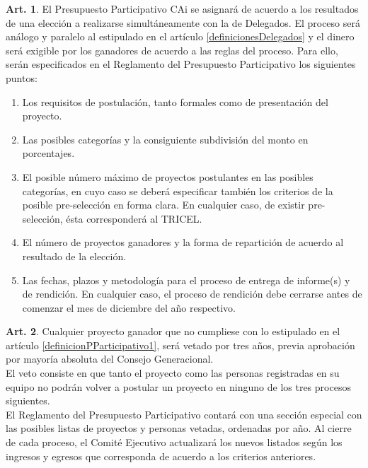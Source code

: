 \documentclass[letterpaper,11pt]{article}
\theoremstyle{definition}%
\newtheorem{art}{Art.} %
\newcommand{\aref}[1]{\hyperref[#1]{\ref*{#1}}}
\begin{document}
\begin{art}\label{definicionPParticipativo2}
	El Presupuesto Participativo CAi se asignará de acuerdo a los resultados de una elección a realizarse simultáneamente con la de Delegados. El proceso será análogo y paralelo al estipulado en el artículo \aref{definicionesDelegados} y el dinero será exigible por los ganadores de acuerdo a las reglas del proceso. Para ello, serán especificados en el Reglamento del Presupuesto Participativo los siguientes puntos:
	\begin{enumerate}
		\item Los requisitos de postulación, tanto formales como de presentación del proyecto.
		\item Las posibles categorías y la consiguiente subdivisión del monto en porcentajes.
		\item El posible número máximo de proyectos postulantes en las posibles categorías, en cuyo caso se deberá especificar también los criterios de la posible pre-selección en forma clara. En cualquier caso, de existir pre-selección, ésta corresponderá al TRICEL\@.
		\item El número de proyectos ganadores y la forma de repartición de acuerdo al resultado de la elección.
		\item Las fechas, plazos y metodología para el proceso de entrega de informe(s) y de rendición. En cualquier caso, el proceso de rendición debe cerrarse antes de comenzar el mes de diciembre del año respectivo.
	\end{enumerate}
\end{art}

\begin{art}\label{sancionesPParticipativo}
	Cualquier proyecto ganador que no cumpliese con lo estipulado en el artículo \aref{definicionPParticipativo1}, será vetado por tres años, previa aprobación por mayoría absoluta del Consejo Generacional.
	\\
	El veto consiste en que tanto el proyecto como las personas registradas en su equipo no podrán volver a postular un proyecto en ninguno de los tres procesos siguientes.
	\\
	El Reglamento del Presupuesto Participativo contará con una sección especial con las posibles listas de proyectos y personas vetadas, ordenadas por año. Al cierre de cada proceso, el Comité Ejecutivo actualizará los nuevos listados según los ingresos y egresos que corresponda de acuerdo a los criterios anteriores.
\end{art}
\end{document}
